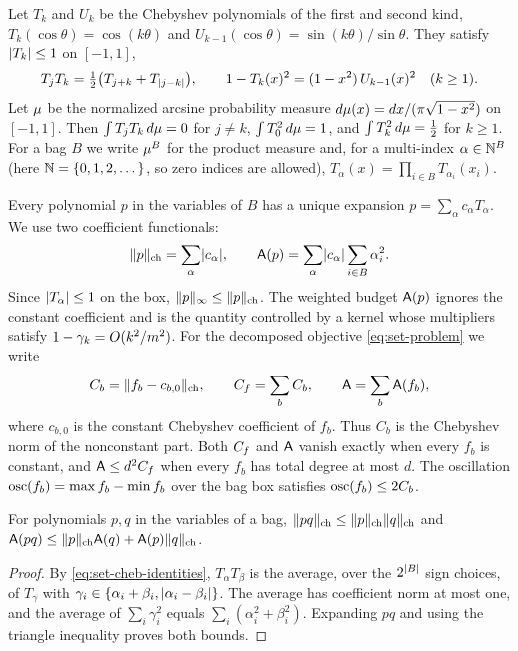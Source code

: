Let $T_k$ and $U_k$ be the Chebyshev polynomials of the first and second
kind, $T_k(\cos\theta)=\cos(k\theta)$ and
$U_{k-1}(\cos\theta)=\sin(k\theta)/\sin\theta$. They satisfy
$\lvert T_k\rvert\le1$ on $[-1,1]$,
\begin{equation}\label{eq:set-cheb-identities}
  T_jT_k=\tfrac12\bigl(T_{j+k}+T_{\lvert j-k\rvert}\bigr),\qquad
  1-T_k(x)^2=(1-x^2)\,U_{k-1}(x)^2\quad(k\ge1).
\end{equation}
Let $\mu$ be the normalized arcsine probability measure
$d\mu(x)=dx/(\pi\sqrt{1-x^2})$ on $[-1,1]$. Then
$\int T_jT_k\,d\mu=0$ for $j\ne k$, $\int T_0^2\,d\mu=1$, and
$\int T_k^2\,d\mu=\tfrac12$ for $k\ge1$. For a bag $B$ we write
$\mu^B$ for the product measure and, for a multi-index
$\alpha\in\mathbb{N}^B$ (here $\mathbb{N}=\{0,1,2,\dots\}$, so zero indices are allowed), $T_\alpha(x)=\prod_{i\in B}T_{\alpha_i}(x_i)$.

Every polynomial $p$ in the variables of $B$ has a unique expansion
$p=\sum_\alpha c_\alpha T_\alpha$. We use two coefficient functionals:
\begin{equation}\label{eq:set-norms}
  \lVert p\rVert_{\mathrm{ch}}=\sum_\alpha\lvert c_\alpha\rvert,\qquad
  \mathsf{A}(p)=\sum_\alpha\lvert c_\alpha\rvert\sum_{i\in B}\alpha_i^2 .
\end{equation}
Since $\lvert T_\alpha\rvert\le1$ on the box, $\lVert p\rVert_\infty\le\lVert p\rVert_{\mathrm{ch}}$.
The weighted budget $\mathsf{A}(p)$ ignores the constant coefficient and is the
quantity controlled by a kernel whose multipliers satisfy
$1-\gamma_k=O(k^2/m^2)$. For the decomposed objective \eqref{eq:set-problem}
we write
\begin{equation}\label{eq:set-budgets}
  C_b=\lVert f_b-c_{b,0}\rVert_{\mathrm{ch}},\qquad C_f=\sum_b C_b,\qquad
  \mathsf{A}=\sum_b\mathsf{A}(f_b),
\end{equation}
where $c_{b,0}$ is the constant Chebyshev coefficient of $f_b$. Thus $C_b$
is the Chebyshev norm of the nonconstant part. Both $C_f$ and $\mathsf{A}$ vanish
exactly when every $f_b$ is constant, and $\mathsf{A}\le d^2C_f$ when every $f_b$
has total degree at most $d$. The oscillation
$\operatorname{osc}(f_b)=\max f_b-\min f_b$ over the bag box satisfies
$\operatorname{osc}(f_b)\le2C_b$.

\begin{lemma}[Products]\label{lem:cheb-product}
For polynomials $p,q$ in the variables of a bag,
$\lVert pq\rVert_{\mathrm{ch}}\le\lVert p\rVert_{\mathrm{ch}}\lVert q\rVert_{\mathrm{ch}}$ and
$\mathsf{A}(pq)\le\lVert p\rVert_{\mathrm{ch}}\mathsf{A}(q)+\mathsf{A}(p)\lVert q\rVert_{\mathrm{ch}}$.
\end{lemma}

\begin{proof}
By \eqref{eq:set-cheb-identities}, $T_\alpha T_\beta$ is the average, over
the $2^{\lvert B\rvert}$ sign choices, of $T_{\gamma}$ with
$\gamma_i\in\{\alpha_i+\beta_i,\lvert \alpha_i-\beta_i\rvert\}$. The average has
coefficient norm at most one, and the average of $\sum_i\gamma_i^2$ equals
$\sum_i(\alpha_i^2+\beta_i^2)$. Expanding $pq$ and using the triangle
inequality proves both bounds.
\end{proof}

